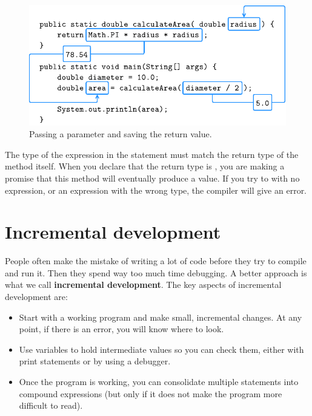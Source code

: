 \begin{figure}[!ht]
\begin{center}
\includegraphics{figs/param.pdf}
\caption{Passing a parameter and saving the return value.}
\label{fig.param}
\end{center}
\end{figure}

The type of the expression in the  statement must match the return type of the method itself.
When you declare that the return type is , you are making a promise that this method will eventually produce a  value.
If you try to  with no expression, or  an expression with the wrong type, the compiler will give an error.


\section{Incremental development}
\label{distance}


People often make the mistake of writing a lot of code before they try to compile and run it.
Then they spend way too much time debugging.
A better approach is what we call {\bf incremental development}.
The key aspects of incremental development are:

\begin{itemize}

\item Start with a working program and make small, incremental changes.
At any point, if there is an error, you will know where to look.

\item Use variables to hold intermediate values so you can check them, either with print statements or by using a debugger.

\item Once the program is working, you can consolidate multiple statements into compound expressions (but only if it does not make the program more difficult to read).

\end{itemize}

